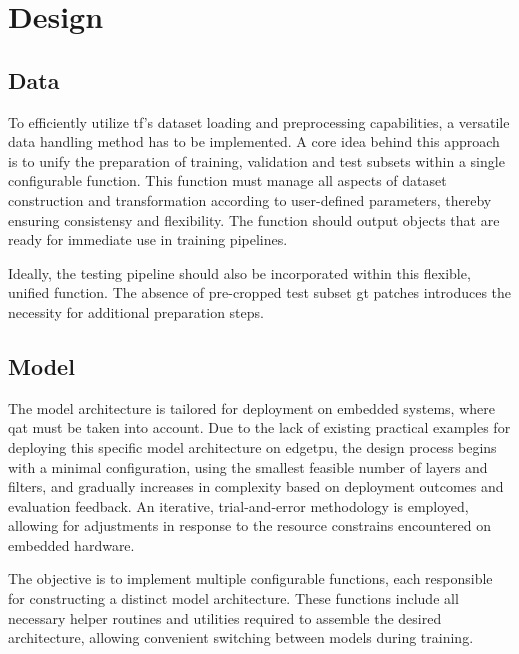 {\section{Design}

\subsection{Data}

To efficiently utilize \gls{tf}'s dataset loading and preprocessing capabilities, a versatile data handling method has to be implemented.
A core idea behind this approach is to unify the preparation of training, validation and test subsets within a single configurable function.
This function must manage all aspects of dataset construction and transformation according to user-defined parameters, thereby ensuring consistensy and flexibility.
The function should output  objects \cite{tfDataset} that are ready for immediate use in training pipelines. \cite{tfPaper}

Ideally, the testing pipeline should also be incorporated within this flexible, unified function.
The absence of pre-cropped test subset \gls{gt} patches introduces the necessity for additional preparation steps.

\subsection{Model}

The model architecture is tailored for deployment on embedded systems, where \gls{qat} must be taken into account.
Due to the lack of existing practical examples for deploying this specific model architecture on \gls{edgetpu},
the design process begins with a minimal configuration, using the smallest feasible number of layers and filters,
and gradually increases in complexity based on deployment outcomes and evaluation feedback.
An iterative, trial-and-error methodology is employed, allowing for adjustments in response to the resource constrains encountered on embedded hardware.

The objective is to implement multiple configurable functions, each responsible for constructing a distinct model architecture.
These functions include all necessary helper routines and utilities required to assemble the desired architecture,
allowing convenient switching between models during training.

}
